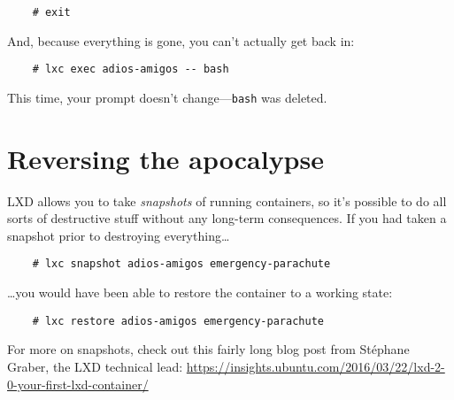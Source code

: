 \begin{verbatim}
    # exit
\end{verbatim}

And, because everything is gone, you can't actually get back in:

\begin{verbatim}
    # lxc exec adios-amigos -- bash
\end{verbatim}

This time, your prompt doesn't change---\texttt{bash} was deleted.

\section*{Reversing the apocalypse}

LXD allows you to take \textit{snapshots} of running containers, so it's possible to do all sorts of destructive stuff without any long-term consequences. If you had taken a snapshot prior to destroying everything\ldots

\begin{verbatim}
    # lxc snapshot adios-amigos emergency-parachute
\end{verbatim}

\ldots you would have been able to restore the container to a working state:

\begin{verbatim}
    # lxc restore adios-amigos emergency-parachute
\end{verbatim}

For more on snapshots, check out this fairly long blog post from St\'{e}phane Graber, the LXD technical lead: \url{https://insights.ubuntu.com/2016/03/22/lxd-2-0-your-first-lxd-container/}
